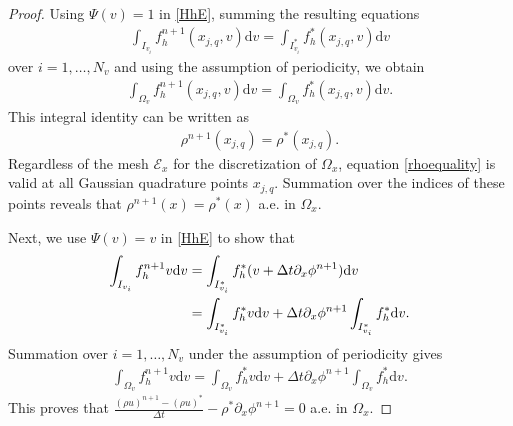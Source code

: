 \documentclass[letterpaper,10pt]{article}
\numberwithin{equation}{section}
\numberwithin{figure}{section}
\numberwithin{table}{section}
\begin{document}
\begin{proof}
Using $\Psi(v)=1$ in \eqref{HhE}, summing the resulting equations
\begin{align}
    \int_{I_{v_i}}f_h^{n+1}(x_{j,q},v)\mathrm dv=\int_{I_{v_i}^*}f_h^*(x_{j,q},v)\mathrm dv
\end{align}
 over $i=1,\ldots,N_v$ and using the assumption of periodicity, we obtain
\begin{align}\label{0m}
    \int_{\Omega_v}f_h^{n+1}(x_{j,q},v)\mathrm dv=\int_{\Omega_v}f_h^*(x_{j,q},v)\mathrm dv.
\end{align}
This integral identity can be written as
\begin{align}\label{rhoequality}
    \rho^{n+1}(x_{j,q})=\rho^*(x_{j,q}).
\end{align}
Regardless of the mesh $\mathcal{E}_x$ for the discretization of $\Omega_x$, equation \eqref{rhoequality} is valid at all Gaussian quadrature points $x_{j,q}$. Summation over the indices of these points reveals that $\rho^{n+1}(x)=\rho^*(x)$ a.e. in
$\Omega_x$.

Next, we use $\Psi(v)=v$ in \eqref{HhE} to show that
\begin{align}
    \int_{I_{v_i}}f_h^{n+1}v\mathrm dv&=\int_{I_{v_i}^*}f_h^*(v+\Delta t\partial_x\phi^{n+1})\mathrm dv\notag\\
    &=\int_{I_{v_i}^*}f_h^*v\mathrm dv+\Delta t\partial_x\phi^{n+1}\int_{I_{v_i}^*}f_h^*
    \mathrm dv.
\end{align}
Summation 
over $i=1,\ldots,N_v$ under the assumption of periodicity gives
\begin{align}\label{1m}
    \int_{\Omega_v}f_h^{n+1}v\mathrm dv=\int_{\Omega_v}f_h^*v\mathrm dv
    +\Delta t\partial_x\phi^{n+1}\int_{\Omega_v}f_h^*\mathrm dv.
\end{align}
This proves that
$\frac{(\rho u)^{n+1}-(\rho u)^*}{\Delta t}-\rho^*\partial_x\phi^{n+1}=0$
a.e. in $\Omega_x$.


\end{proof}
\end{document}
